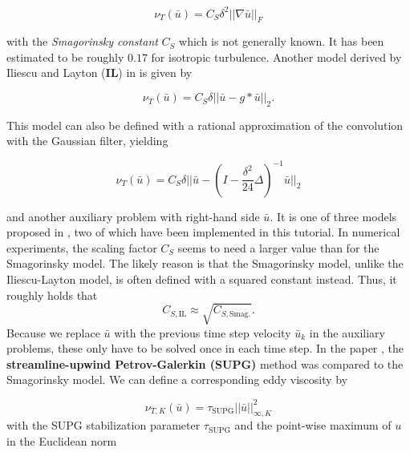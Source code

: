 \documentclass[a4paper, 11pt, twoside]{article}
\begin{document}
\begin{equation}
\label{eq:Smagorinsky}
    \nu_T(\bar{u}) = C_S \delta^2 ||\nabla\bar{u}||_F
\end{equation} 

with the \textit{Smagorinsky constant}  $C_S$ which is not generally known. It has been estimated to be roughly $0.17$ for isotropic turbulence. Another model derived by Iliescu and Layton (\textbf{IL}) in \cite{Iliescu} is given by 

\begin{equation}
\label{eq:IL}
    \nu_T(\bar{u}) = C_S \delta ||\bar{u} - g * \bar u||_2.
\end{equation} 

This model can also be defined with a rational approximation of the convolution with the Gaussian filter, yielding 

\begin{equation}
    \nu_T(\bar{u}) = C_S \delta ||\bar{u} - (I-\frac{\delta^2}{24}\Delta)^{-1} \bar u||_2 \label{eq:iliLayton}
\end{equation} 

and another auxiliary problem  with right-hand side $\bar{u}$. It is one of three models proposed in \cite{Iliescu}, two of which have been implemented in this tutorial. In numerical experiments, the scaling factor $C_S$ seems to need a larger value than for the Smagorinsky model. The likely reason is that the Smagorinsky model, unlike the Iliescu-Layton model, is often defined with a squared constant instead. Thus, it roughly holds that \begin{equation}
    C_{S, \text{IL}} \approx \sqrt{C_{S, \text{Smag.}}}.
\end{equation} Because we replace $\bar{u}$ with the previous time step velocity $\bar{u}_k$ in the auxiliary problems, these only have to be solved once in each time step. In the paper \cite{Akin}, the \textbf{streamline-upwind Petrov-Galerkin (SUPG)}  method was compared to the Smagorinsky model. We can define a corresponding eddy viscosity  by 

\begin{equation}
\label{eq:SUPG}
    \nu_{T,K}(\bar{u}) = \tau_{\mathrm{SUPG}} ||\bar{u}||_{\infty,K}^2
\end{equation} 
with the SUPG stabilization parameter $\tau_{\mathrm{SUPG}}$ and the point-wise maximum of $u$ in the Euclidean norm 
\end{document}
